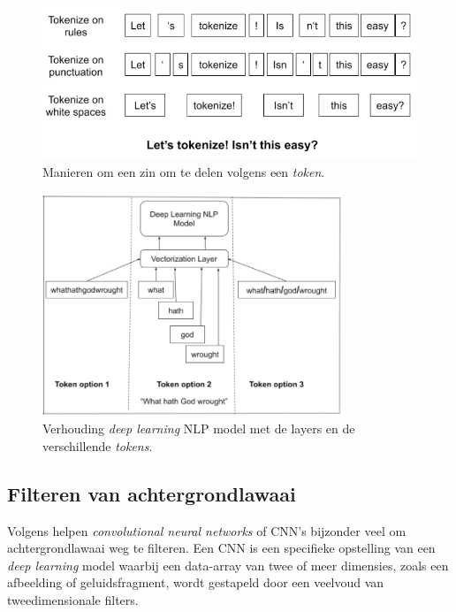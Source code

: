 {\begin{figure}
    \centering
    \includegraphics[width=1\textwidth]{./img/tokenize_manier}
    \caption{\label{fig:tokens} Manieren om een zin om te delen volgens een \textit{token}.~\autocite{Horan2020}}
\end{figure}

\begin{figure}
    \centering
    \includegraphics[width=0.8\textwidth]{./img/tokenization-1}
    \caption{\label{fig:tokens_verhouding_dl}Verhouding \textit{deep learning} NLP model met de layers en de verschillende \textit{tokens}.~\autocite{Horan2020}}
\end{figure}


\subsection{Filteren van achtergrondlawaai}
Volgens \textcite{Jung2021} helpen \textit{convolutional neural networks} of CNN's bijzonder veel om achtergrondlawaai weg te filteren. Een CNN is een specifieke opstelling van een \textit{deep learning} model waarbij een
data-array van twee of meer dimensies, zoals een afbeelding of geluidsfragment, wordt gestapeld door een veelvoud van tweedimensionale filters.

}
